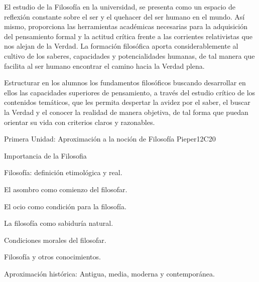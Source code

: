 \begin{syllabus}


\begin{justification}
El estudio de la Filosofía en la universidad, se presenta como un espacio de reflexión constante sobre el ser y el quehacer del ser humano en el mundo. Así mismo, proporciona las herramientas académicas necesarias para la adquisición del pensamiento formal y la actitud crítica frente a las corrientes relativistas que nos alejan de la Verdad.
La formación filosófica aporta considerablemente al cultivo de los saberes, capacidades y potencialidades humanas, de tal manera que facilita al ser humano encontrar el camino hacia la Verdad plena.
\end{justification}

\begin{goals}
\item Estructurar en los alumnos los fundamentos filosóficos buscando desarrollar en ellos las capacidades superiores de pensamiento, a través del estudio crítico de los contenidos temáticos, que les permita despertar la avidez por el saber, el buscar la Verdad y el conocer la realidad de manera objetiva, de tal forma que puedan orientar su vida con criterios claros y razonables.
\end{goals}

\begin{outcomes}
    \item {}
    \item {}
    \item {}
\end{outcomes}
\begin{competences}
    \item {}
    \item {}
\end{competences}

\begin{unit}{}{Primera Unidad: Aproximación a la noción de Filosofía }{Pieper}{12}{C20}
\begin{topics}
	\item Importancia de la Filosofia
	\item Filosofía: definición etimológica y real.
	\item El asombro como comienzo del filosofar.
	\item El ocio como condición para la filosofía.
    \item La filosofía como sabiduría natural.
    \item Condiciones morales del filosofar.
    \item Filosofía y otros conocimientos.
    \item Aproximación histórica: Antigua, media, moderna y contemporánea.
\end{topics}


\end{unit}
\end{syllabus}
